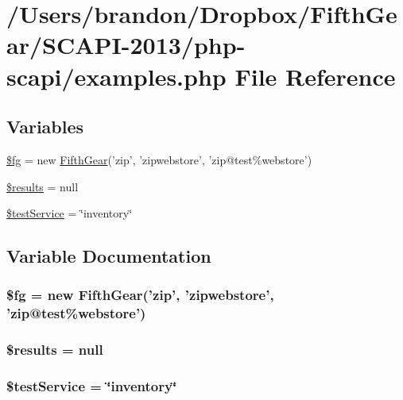 \hypertarget{examples_8php}{\section{/\-Users/brandon/\-Dropbox/\-Fifth\-Gear/\-S\-C\-A\-P\-I-\/2013/php-\/scapi/examples.php File Reference}
\label{examples_8php}
}
\subsection*{Variables}
\begin{DoxyCompactItemize}
\item 
\hyperlink{examples_8php_a9aabe663cd2b0b70b964c291b93dba64}{\$fg} = new \hyperlink{class_fifth_gear}{Fifth\-Gear}('zip', 'zipwebstore', 'zip@test\%webstore')
\item 
\hyperlink{examples_8php_a233d12bd8b6d3453e9a7a3f0b8c31db2}{\$results} = null
\item 
\hyperlink{examples_8php_ac63431a912ae1068a9b792c1ea2b1dda}{\$test\-Service} = \char`\"{}inventory\char`\"{}
\end{DoxyCompactItemize}


\subsection{Variable Documentation}
\hypertarget{examples_8php_a9aabe663cd2b0b70b964c291b93dba64}{
\subsubsection[{\$fg}]{\setlength{\rightskip}{0pt plus 5cm}\$fg = new {\bf Fifth\-Gear}('zip', 'zipwebstore', 'zip@test\%webstore')}}\label{examples_8php_a9aabe663cd2b0b70b964c291b93dba64}
\hypertarget{examples_8php_a233d12bd8b6d3453e9a7a3f0b8c31db2}{
\subsubsection[{\$results}]{\setlength{\rightskip}{0pt plus 5cm}\$results = null}}\label{examples_8php_a233d12bd8b6d3453e9a7a3f0b8c31db2}
\hypertarget{examples_8php_ac63431a912ae1068a9b792c1ea2b1dda}{
\subsubsection[{\$test\-Service}]{\setlength{\rightskip}{0pt plus 5cm}\$test\-Service = \char`\"{}inventory\char`\"{}}}\label{examples_8php_ac63431a912ae1068a9b792c1ea2b1dda}

